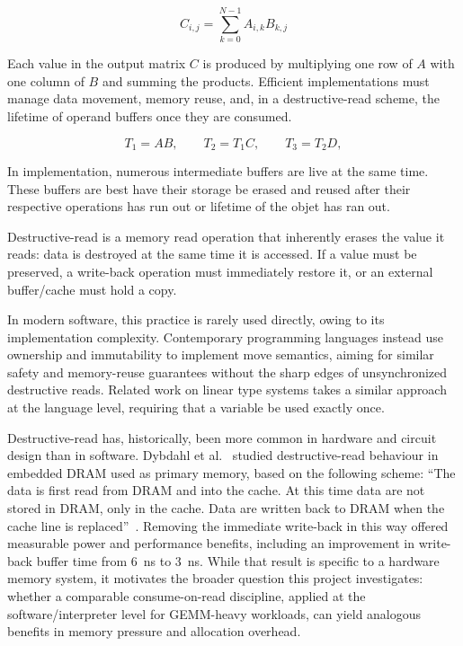 \documentclass[a4paper]{article}
\begin{document}
	\begin{equation}
		C_{i,j} = \sum_{k=0}^{N-1} A_{i,k}B_{k,j}
	\end{equation}
	
	Each value in the output matrix $C$ is produced by multiplying one row of $A$ with one column of $B$ and summing the products. Efficient implementations must manage data movement, memory reuse, and, in a destructive-read scheme, the lifetime of operand buffers once they are consumed.
	
	\begin{equation}
	T_1 = A B,\qquad
	T_2 = T_1 C,\qquad
	T_3 = T_2 D,
	\end{equation}
	
	In implementation, numerous intermediate buffers are live at the same time. These buffers are best have their storage be erased and reused after their respective operations has run out or lifetime of the objet has ran out.
	
	
	Destructive-read is a memory read operation that inherently erases the value it reads: data is destroyed at the same time it is accessed. If a value must be preserved, a write-back operation must immediately restore it, or an external buffer/cache must hold a copy.
	
	In modern software, this practice is rarely used directly, owing to its implementation complexity. Contemporary programming languages instead use ownership and immutability to implement move semantics, aiming for similar safety and memory-reuse guarantees without the sharp edges of unsynchronized destructive reads. Related work on linear type systems takes a similar approach at the language level, requiring that a variable be used exactly once.
	
	Destructive-read has, historically, been more common in hardware and circuit design than in software. Dybdahl et al.~\cite{DybdahlKGN06} studied destructive-read behaviour in embedded DRAM used as primary memory, based on the following scheme: ``The data is first read from DRAM and into the cache. At this time data are not stored in DRAM, only in the cache. Data are written back to DRAM when the cache line is replaced''~\cite{DybdahlKGN06}. Removing the immediate write-back in this way offered measurable power and performance benefits, including an improvement in write-back buffer time from 6~ns to 3~ns. While that result is specific to a hardware memory system, it motivates the broader question this project investigates: whether a comparable consume-on-read discipline, applied at the software/interpreter level for GEMM-heavy workloads, can yield analogous benefits in memory pressure and allocation overhead.
	
\end{document}
